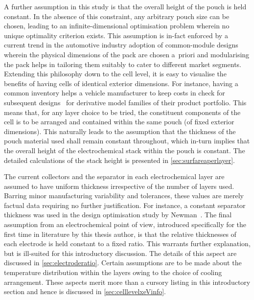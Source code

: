 A further assumption  in this study is  that the overall height of  the pouch is
held constant. In  the absence of this constraint, any  arbitrary pouch size can
be chosen,  leading to an  infinite-dimensional optimisation problem  wherein no
unique optimality  criterion exists.  This assumption is  in-fact enforced  by a
current  trend  in the  automotive  industry  \viz{} adoption  of  common-module
designs wherein  the physical  dimensions of  the pack  are chosen  a~priori and
modularising the  pack helps in  tailoring them  suitably to cater  to different
market segments. Extending this philosophy down to the cell level, it is easy to
visualise the  benefits of  having cells of  identical exterior  dimensions. For
instance, having a  common inventory helps a vehicle manufacturer  to keep costs
in check  for subsequent designs  \eg~for  derivative model families  of their
product  portfolio. This  means that,  for  any layer  choice to  be tried,  the
constituent components  of the cell is  to be arranged and  contained within the
same  pouch  (of  fixed  exterior  dimensions).  This  naturally  leads  to  the
assumption that the  thickness of the pouch material used  shall remain constant
throughout, which in-turn implies that the overall height of the electrochemical
stack  within the  pouch is  constant. The  detailed calculations  of the  stack
height is presented in \cref{sec:surfareaperlayer}.

The  current collectors  and the  separator  in each  electrochemical layer  are
assumed  to  have  uniform  thickness  irrespective  of  the  number  of  layers
used.  Barring  minor manufacturing  variability  and  tolerances, these  values
are  merely  factual data  requiring  no  further justification.  For  instance,
a  constant  separator thickness  was  used  in  the design  optimisation  study
by  Newman~\cite{Newman1995}.  The  final  assumption  from  an  electrochemical
point  of view,  introduced specifically  for the  first time  in literature  by
this  thesis author,  is  that the  relative thicknesses  of  each electrode  is
held  constant to  a  fixed ratio.  This warrants  further  explanation, but  is
ill-suited  for this  introductory discussion.  The details  of this  aspect are
discussed  in  \cref{sec:electroderatio}. Certain  assumptions  are  to be  made
about the  temperature distribution  within the  layers owing  to the  choice of
cooling arrangement.  These aspects merit  more than  a cursory listing  in this
introductory section and hence is discussed in \cref{sec:celllevelxeVinfo}.

